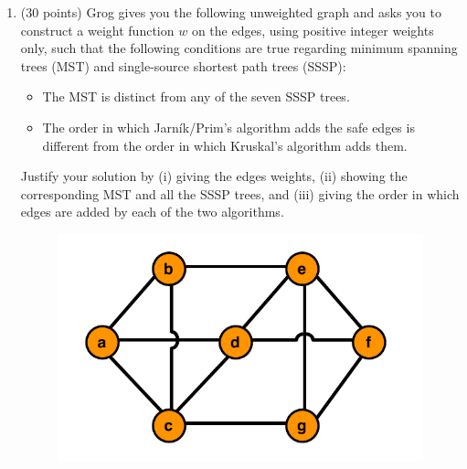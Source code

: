 \documentclass[12pt]{article}
\begin{document}
\renewcommand{\headrulewidth}{0.4pt}

\vspace{-3mm}
\begin{enumerate}
	\item (30 points) Grog gives you the following unweighted graph and asks you to construct a weight function $w$ on the edges, using positive integer weights only, such that the following conditions are true regarding minimum spanning trees (MST) and single-source shortest path trees (SSSP):
	\begin{itemize}
	\itemsep-0.1pt
	\item The MST is distinct from any of the seven SSSP trees.
	\item The order in which Jarn\'ik/Prim's algorithm adds the safe edges is different from the order in which Kruskal's algorithm adds them.
	\end{itemize}
	Justify your solution by (i) giving the edges weights, (ii) showing the corresponding MST and all the SSSP trees, and (iii) giving the order in which edges are added by each of the two algorithms.

    \begin{figure}[h!]
    \begin{center}
    \includegraphics[scale=0.7]{unweighted_graph.png} 
    \end{center}
    \end{figure}


\end{enumerate}
\end{document}
